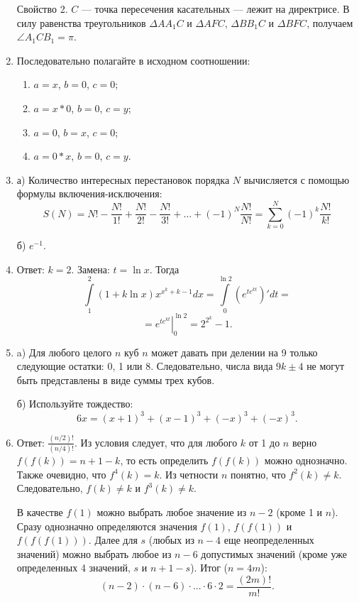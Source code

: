 \begin{enumerate}
Свойство 2. $C$ --- точка пересечения касательных --- лежит на директрисе. В силу равенства треугольников $\Delta AA_1C$ и $\Delta AFC$, $\Delta BB_1C$ и $\Delta BFC$, получаем $\angle A_1CB_1 = \pi$.


\item Последовательно полагайте в исходном соотношении:
\begin{enumerate}
\item $a = x$, $b = 0$, $c = 0$;
\item $a = x * 0$, $b = 0$, $c = y$;
\item $a = 0$, $b = x$, $c = 0$;
\item $a = 0 * x$, $b = 0$, $c = y$.
\end{enumerate}

\item а) Количество интересных перестановок порядка $N$ вычисляется с помощью формулы включения-исключения:
$$S(N) = N!-{\frac {N!}{1!}}+{\frac {N!}{2!}}-{\frac {N!}{3!}} + \dots +(-1)^{N}{\frac {N!}{N!}}=\sum _{k=0}^{N}(-1)^{k}{\frac {N!}{k!}}
$$

б) $e^{-1}$.

\item Ответ: $k = 2$. Замена: $t = \ln{x}$. Тогда
$$\int\limits_{1}^{2} \left( 1 + k \ln{x} \right) x^{x^k + k - 1} dx = \int\limits_{0}^{\ln{2}} \left(e^{te^{kt}} \right)' dt = $$
$$=\left. e^{te^{kt}} \right|_{0}^{\ln{2}} = 2^{2^k} - 1.$$

\item a) Для любого целого $n$ куб $n$ может давать при делении на 9 только следующие остатки: 0, 1 или 8. Следовательно, числа вида $9k \pm 4$ не могут быть представлены в виде суммы трех кубов.

б) Используйте тождество:
$$6x = (x+1)^3 + (x-1)^3 + (-x)^3 + (-x)^3.$$

\item Ответ: $\frac{(n/2)!}{(n/4)!}$. Из условия следует, что для любого $k$ от 1 до $n$ верно $f(f(k)) = n + 1 - k$, то есть определить $f(f(k))$ можно однозначно. Также очевидно, что $f^4(k) = k$. Из четности $n$ понятно, что $f^2(k) \neq k$. Следовательно, $f(k) \neq k$ и $f^3(k) \neq k$. 

В качестве $f(1)$ можно выбрать любое значение из $n-2$ (кроме 1 и $n$). Сразу однозначно определяются значения $f(1)$, $f(f(1))$ и $f(f(f(1)))$. Далее для $s$ (любых из $n-4$ еще неопределенных значений) можно выбрать любое из $n-6$ допустимых значений (кроме уже определенных 4 значений, $s$ и $n+1-s$). Итог ($n = 4m$):
$$(n-2) \cdot  (n-6) \cdot  ... \cdot  6 \cdot 2 = \frac{(2m)!}{m!}.$$


\end{enumerate}
